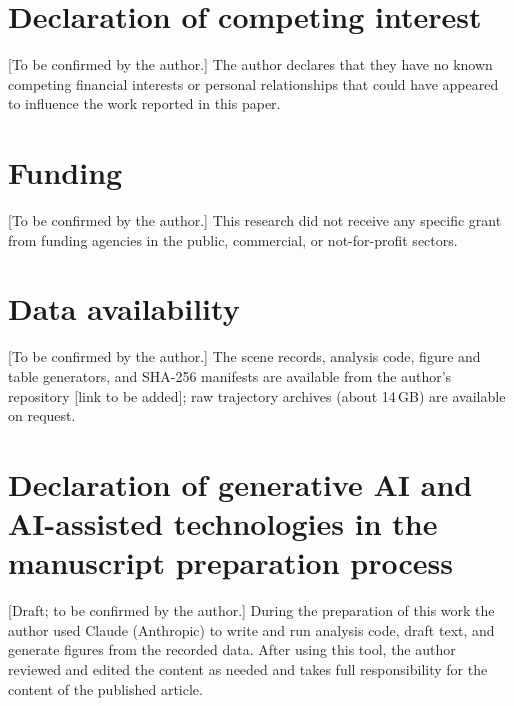 \documentclass[preprint,12pt]{elsarticle}
\begin{document}
\section*{Declaration of competing interest}
[To be confirmed by the author.] The author declares that they have no known competing financial interests or personal relationships that could have appeared to influence the work reported in this paper.

\section*{Funding}
[To be confirmed by the author.] This research did not receive any specific grant from funding agencies in the public, commercial, or not-for-profit sectors.

\section*{Data availability}
[To be confirmed by the author.] The scene records, analysis code, figure and table generators, and SHA-256 manifests are available from the author's repository [link to be added]; raw trajectory archives (about 14\,GB) are available on request.

\section*{Declaration of generative AI and AI-assisted technologies in the manuscript preparation process}
[Draft; to be confirmed by the author.] During the preparation of this work the author used Claude (Anthropic) to write and run analysis code, draft text, and generate figures from the recorded data. After using this tool, the author reviewed and edited the content as needed and takes full responsibility for the content of the published article.



\end{document}
